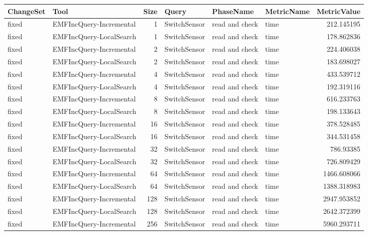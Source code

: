 \begin{table}
\centering
\footnotesize
\begin{tabular}{| l | l | r | l | l | l | r |}
\hline
\sf ChangeSet & \sf Tool & \sf Size & \sf Query & \sf PhaseName & \sf MetricName & \sf MetricValue\\\hline
fixed & EMFIncQuery-Incremental & 1 & SwitchSensor & read and check & time & 212.145195\\\hline
fixed & EMFIncQuery-LocalSearch & 1 & SwitchSensor & read and check & time & 178.862836\\\hline
fixed & EMFIncQuery-Incremental & 2 & SwitchSensor & read and check & time & 224.406038\\\hline
fixed & EMFIncQuery-LocalSearch & 2 & SwitchSensor & read and check & time & 183.698027\\\hline
fixed & EMFIncQuery-Incremental & 4 & SwitchSensor & read and check & time & 433.539712\\\hline
fixed & EMFIncQuery-LocalSearch & 4 & SwitchSensor & read and check & time & 192.319116\\\hline
fixed & EMFIncQuery-Incremental & 8 & SwitchSensor & read and check & time & 616.233763\\\hline
fixed & EMFIncQuery-LocalSearch & 8 & SwitchSensor & read and check & time & 198.133643\\\hline
fixed & EMFIncQuery-Incremental & 16 & SwitchSensor & read and check & time & 378.528485\\\hline
fixed & EMFIncQuery-LocalSearch & 16 & SwitchSensor & read and check & time & 344.531458\\\hline
fixed & EMFIncQuery-Incremental & 32 & SwitchSensor & read and check & time & 786.93385\\\hline
fixed & EMFIncQuery-LocalSearch & 32 & SwitchSensor & read and check & time & 726.809429\\\hline
fixed & EMFIncQuery-Incremental & 64 & SwitchSensor & read and check & time & 1466.608066\\\hline
fixed & EMFIncQuery-LocalSearch & 64 & SwitchSensor & read and check & time & 1388.318983\\\hline
fixed & EMFIncQuery-Incremental & 128 & SwitchSensor & read and check & time & 2947.953852\\\hline
fixed & EMFIncQuery-LocalSearch & 128 & SwitchSensor & read and check & time & 2642.372399\\\hline
fixed & EMFIncQuery-Incremental & 256 & SwitchSensor & read and check & time & 5960.293711\\\hline

\end{tabular}
\end{table}
